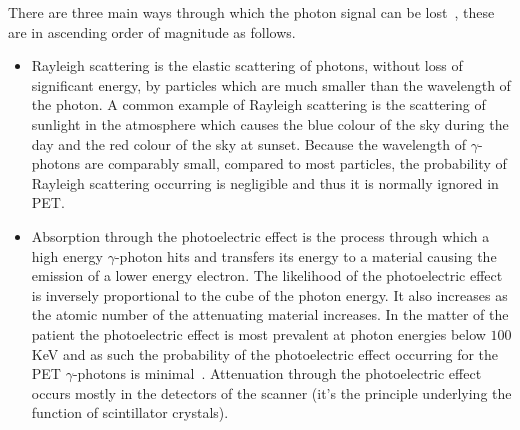                 There are three main ways through which the photon signal can be lost~\parencite{scienceofpetspringer}, these are in ascending order of magnitude as follows.
                
                \begin{itemize}
                    
                    \item Rayleigh scattering is the elastic scattering of photons, without loss of significant energy, by particles which are much smaller than the wavelength of the photon. A common example of Rayleigh scattering is the scattering of sunlight in the atmosphere which causes the blue colour of the sky during the day and the red colour of the sky at sunset. Because the wavelength of $\gamma$-photons are comparably small, compared to most particles, the probability of Rayleigh scattering occurring is negligible and thus it is normally ignored in \gls{PET}.
                    
                    \item Absorption through the photoelectric effect is the process through which a high energy $\gamma$-photon hits and transfers its energy to a material causing the emission of a lower energy electron. The likelihood of the photoelectric effect is inversely proportional to the cube of the photon energy. It also increases as the atomic number of the attenuating material increases. In the matter of the patient the photoelectric effect is most prevalent at photon energies below $100$ \gls{KeV} and as such the probability of the photoelectric effect occurring for the \gls{PET} $\gamma$-photons is minimal~\parencite{petspringer}. %
                    Attenuation through the photoelectric effect occurs mostly in the detectors of the scanner (it's the principle underlying the function of scintillator crystals).
                    

\end{itemize}
